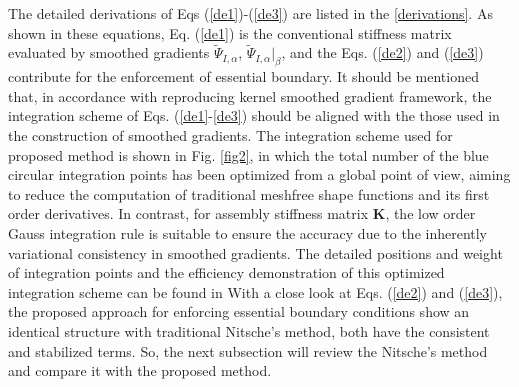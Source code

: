 The detailed derivations of Eqs (\ref{de1})-(\ref{de3}) are listed in the \ref{derivations}. As shown in these equations, Eq. (\ref{de1}) is the conventional stiffness matrix evaluated by smoothed gradients $\tilde \Psi_{I,\alpha}$, $\tilde \Psi_{I,\alpha}\vert_\beta$, and the Eqs. (\ref{de2}) and (\ref{de3}) contribute for the enforcement of essential boundary. It should be mentioned that, in accordance with reproducing kernel smoothed gradient framework, the integration scheme of Eqs. (\ref{de1}-\ref{de3}) should be aligned with the those used in the construction of smoothed gradients. The integration scheme used for proposed method is shown in Fig. \ref{fig2}, in which the total number of the blue circular integration points has been optimized from a global point of view, aiming to reduce the computation of traditional meshfree shape functions and its first order derivatives. In contrast, for assembly stiffness matrix $\boldsymbol K$, the low order Gauss integration rule is suitable to ensure the accuracy due to the inherently variational consistency in smoothed gradients. The detailed positions and weight of integration points and the efficiency demonstration of this optimized integration scheme can be found in \cite{wang2019a, du2022}  With a close look at Eqs. (\ref{de2}) and (\ref{de3}), the proposed approach for enforcing essential boundary conditions show an identical structure with traditional Nitsche's method, both have the consistent and stabilized terms. So, the next subsection will review the Nitsche's method and compare it with the proposed method.

